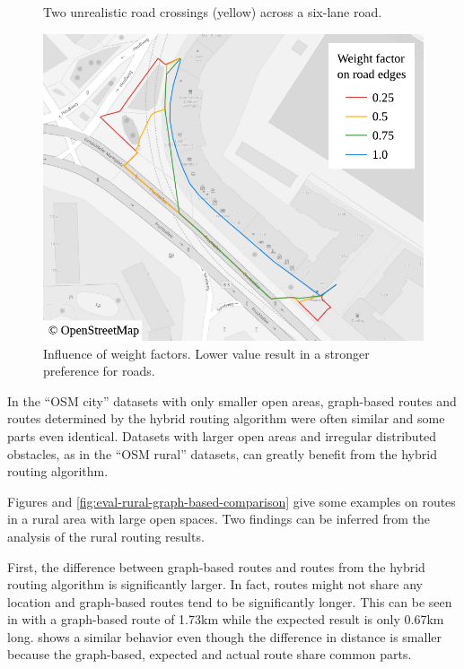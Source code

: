 \begin{figure}[h!]
\begin{minipage}[t]{.48\textwidth}
\begin{figcenter}
					\end{figcenter}
					\caption{Two unrealistic road crossings (yellow) across a six-lane road.}
					\label{fig:eval-city-road-crossing}
				\end{minipage}
				\hfill
				\begin{minipage}[t]{.48\textwidth}
					\begin{figcenter}
						\includegraphics[width=\textwidth]{images/qgis-routing-city-weights}
					\end{figcenter}
					\caption{Influence of weight factors. Lower value result in a stronger preference for roads.}
					\label{fig:eval-city-weights}
				\end{minipage}
			\end{figure}
			
			In the \enquote{OSM city} datasets with only smaller open areas, graph-based routes and routes determined by the hybrid routing algorithm were often similar and some parts even identical.
			Datasets with larger open areas and irregular distributed obstacles, as in the \enquote{OSM rural} datasets, can greatly benefit from the hybrid routing algorithm.
			
			Figures  and \ref{fig:eval-rural-graph-based-comparison} give some examples on routes in a rural area with large open spaces.
			Two findings can be inferred from the analysis of the rural routing results.
			
			First, the difference between graph-based routes and routes from the hybrid routing algorithm is significantly larger.
			In fact, routes might not share any location and graph-based routes tend to be significantly longer.
			This can be seen in  with a graph-based route of 1.73km while the expected result is only 0.67km long.
			 shows a similar behavior even though the difference in distance is smaller because the graph-based, expected and actual route share common parts.
			
